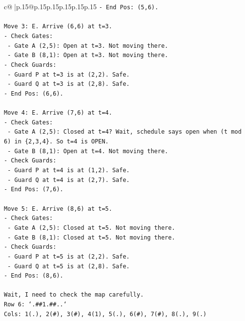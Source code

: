 \documentclass{article}
\begin{document}
{\begin{supertabular}{c@{$\;$}|p{.15\linewidth}@{}p{.15\linewidth}p{.15\linewidth}p{.15\linewidth}p{.15\linewidth}p{.15\linewidth}}
{{{\texttt{{-} End Pos: (5,6).} \\
\\ 
\texttt{Move 3: E. Arrive (6,6) at t=3.} \\
\texttt{{-} Check Gates:} \\
\texttt{  {-} Gate A (2,5): Open at t=3. Not moving there.} \\
\texttt{  {-} Gate B (8,1): Open at t=3. Not moving there.} \\
\texttt{{-} Check Guards:} \\
\texttt{  {-} Guard P at t=3 is at (2,2). Safe.} \\
\texttt{  {-} Guard Q at t=3 is at (2,8). Safe.} \\
\texttt{{-} End Pos: (6,6).} \\
\\ 
\texttt{Move 4: E. Arrive (7,6) at t=4.} \\
\texttt{{-} Check Gates:} \\
\texttt{  {-} Gate A (2,5): Closed at t=4? Wait, schedule says open when (t mod 6) in \{2,3,4\}. So t=4 is OPEN.} \\
\texttt{  {-} Gate B (8,1): Open at t=4. Not moving there.} \\
\texttt{{-} Check Guards:} \\
\texttt{  {-} Guard P at t=4 is at (1,2). Safe.} \\
\texttt{  {-} Guard Q at t=4 is at (2,7). Safe.} \\
\texttt{{-} End Pos: (7,6).} \\
\\ 
\texttt{Move 5: E. Arrive (8,6) at t=5.} \\
\texttt{{-} Check Gates:} \\
\texttt{  {-} Gate A (2,5): Closed at t=5. Not moving there.} \\
\texttt{  {-} Gate B (8,1): Closed at t=5. Not moving there.} \\
\texttt{{-} Check Guards:} \\
\texttt{  {-} Guard P at t=5 is at (2,2). Safe.} \\
\texttt{  {-} Guard Q at t=5 is at (2,8). Safe.} \\
\texttt{{-} End Pos: (8,6).} \\
\\ 
\texttt{Wait, I need to check the map carefully.} \\
\texttt{Row 6: `.\#\#1.\#\#..`} \\
\texttt{Cols: 1(.), 2(\#), 3(\#), 4(1), 5(.), 6(\#), 7(\#), 8(.), 9(.)} \\
}}}
\end{supertabular}}
\end{document}
